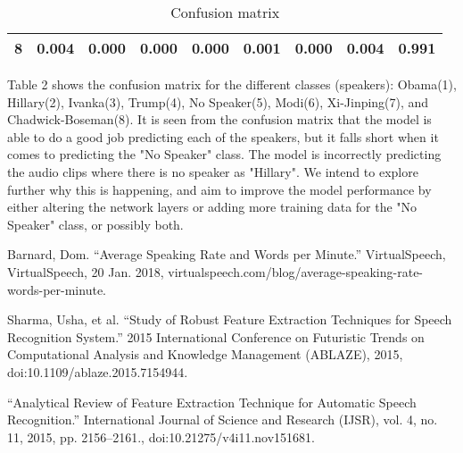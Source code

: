 \documentclass[10pt,twocolumn,letterpaper]{article}
\begin{document}
\begin{table}[h]
\begin{tabular}{l|l|l|l|l|l|l|l|l|}
    \multicolumn{1}{|l|}{\textbf{8}} & 0.004                         & 0.000                         & 0.000                         & 0.000                         & 0.001                         & 0.000                         & 0.004                         & \cellcolor[HTML]{67FD9A}0.991 \\ \hline
    \end{tabular}
    \caption{Confusion matrix}
    \label{Confusion matrix}
\end{table}


Table 2 shows the confusion matrix for the different classes (speakers): Obama(1), Hillary(2), Ivanka(3), Trump(4), No Speaker(5), Modi(6), Xi-Jinping(7), and Chadwick-Boseman(8). It is seen from the confusion matrix that the model is able to do a good job predicting each of the speakers, but it falls short when it comes to predicting the "No Speaker" class. The model is incorrectly predicting the audio clips where there is no speaker as "Hillary". We intend to explore further why this is happening, and aim to improve the model performance by either altering the network layers or adding more training data for the "No Speaker" class, or possibly both.


\begin{thebibliography}{1}

      Barnard, Dom. “Average Speaking Rate and Words per Minute.” VirtualSpeech, VirtualSpeech, 20 Jan. 2018, virtualspeech.com/blog/average-speaking-rate-words-per-minute. 
  
      Sharma, Usha, et al. “Study of Robust Feature Extraction Techniques for Speech Recognition System.” 2015 International Conference on Futuristic Trends on Computational Analysis and Knowledge Management (ABLAZE), 2015, doi:10.1109/ablaze.2015.7154944. 
  
    “Analytical Review of Feature Extraction Technique for Automatic Speech Recognition.” International Journal of Science and Research (IJSR), vol. 4, no. 11, 2015, pp. 2156–2161., doi:10.21275/v4i11.nov151681. 
  
  
\end{thebibliography}
\end{document}
